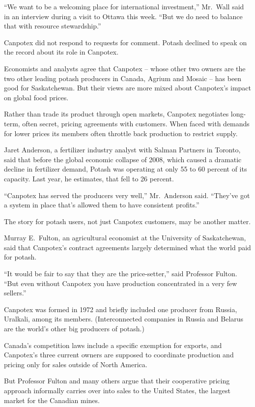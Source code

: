 ﻿\documentclass[12pt]{article}
\begin{document}
``We want to be a welcoming place for international investment,'' Mr.~Wall said in an interview
during a visit to Ottawa this week. ``But we do need to balance that with resource stewardship.''

Canpotex did not respond to requests for comment. Potash declined to speak on the record about its
role in Canpotex.

Economists and analysts agree that Canpotex -- whose other two owners are the two other leading
potash producers in Canada, Agrium and Mosaic -- has been good for Saskatchewan. But their views are
more mixed about Canpotex's impact on global food prices.

Rather than trade its product through open markets, Canpotex negotiates long-term, often secret,
pricing agreements with customers. When faced with demands for lower prices its members often
throttle back production to restrict supply.

Jaret Anderson, a fertilizer industry analyst with Salman Partners in Toronto, said that before the
global economic collapse of 2008, which caused a dramatic decline in fertilizer demand, Potash was
operating at only 55 to 60 percent of its capacity. Last year, he estimates, that fell to 26
percent.

``Canpotex has served the producers very well,'' Mr.~Anderson said. ``They've got a system in place
that's allowed them to have consistent profits.''

The story for potash users, not just Canpotex customers, may be another matter.

Murray E.~Fulton, an agricultural economist at the University of Saskatchewan, said that Canpotex's
contract agreements largely determined what the world paid for potash.

``It would be fair to say that they are the price-setter,'' said Professor Fulton. ``But even
without Canpotex you have production concentrated in a very few sellers.''

Canpotex was formed in 1972 and briefly included one producer from Russia, Uralkali, among its
members. (Interconnected companies in Russia and Belarus are the world's other big producers of
potash.)

Canada's competition laws include a specific exemption for exports, and Canpotex's three current
owners are supposed to coordinate production and pricing only for sales outside of North America.

But Professor Fulton and many others argue that their cooperative pricing approach informally
carries over into sales to the United States, the largest market for the Canadian mines.
\end{document}

